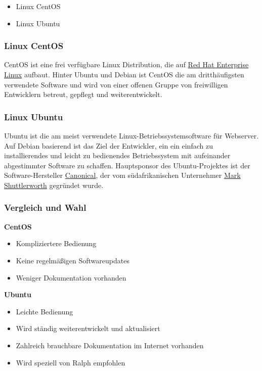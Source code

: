 \begin{itemize}
\tightlist
\item
  Linux CentOS
\item
  Linux Ubuntu
\end{itemize}

\hypertarget{linux-centos}{%
\subsubsection{Linux CentOS}\label{linux-centos}}

CentOS ist eine frei verfügbare Linux Distribution, die auf
\href{https://de.wikipedia.org/wiki/Red_Hat_Enterprise_Linux}{Red Hat
Enterprise Linux} aufbaut. Hinter Ubuntu und Debian ist CentOS die am
dritthäufigsten verwendete Software und wird von einer offenen Gruppe
von freiwilligen Entwicklern betreut, gepflegt und weiterentwickelt.

\hypertarget{linux-ubuntu}{%
\subsubsection{Linux Ubuntu}\label{linux-ubuntu}}

Ubuntu ist die am meist verwendete Linux-Betriebssystemsoftware für
Webserver. Auf Debian basierend ist das Ziel der Entwickler, ein ein
einfach zu installierendes und leicht zu bedienendes Betriebssystem mit
aufeinander abgestimmter Software zu schaffen. Hauptsponsor des
Ubuntu-Projektes ist der Software-Hersteller
\href{https://de.wikipedia.org/wiki/Canonical}{Canonical}, der vom
südafrikanischen Unternehmer
\href{https://de.wikipedia.org/wiki/Mark_Shuttleworth}{Mark
Shuttlerworth} gegründet wurde.

\hypertarget{vergleich-und-wahl}{%
\subsubsection{Vergleich und Wahl}\label{vergleich-und-wahl}}

\textbf{CentOS}

\begin{itemize}
\tightlist
\item
  Kompliziertere Bedienung
\item
  Keine regelmäßigen Softwareupdates
\item
  Weniger Dokumentation vorhanden
\end{itemize}

\textbf{Ubuntu}

\begin{itemize}
\tightlist
\item
  Leichte Bedienung
\item
  Wird ständig weiterentwickelt und aktualisiert
\item
  Zahlreich brauchbare Dokumentation im Internet vorhanden
\item
  Wird speziell von Ralph empfohlen
\end{itemize}

